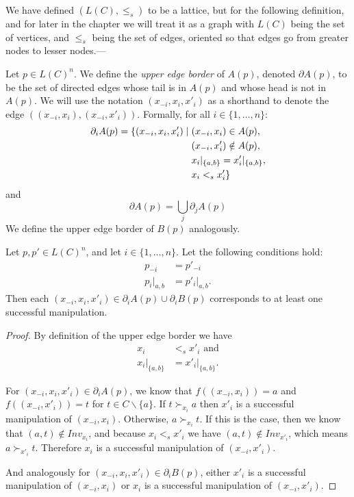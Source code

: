 	We have defined $(L(C), \le_s)$ to be a lattice, but for the following definition, and for later in the chapter we will treat it as a graph with $L(C)$ being the set of vertices, and $\le_s$ being the set of edges, oriented so that edges go from greater nodes to lesser nodes.---

	\begin{definition}
		Let $p \in L(C)^n$. We define the \emph{upper edge border} of $A(p)$, denoted $\partial A(p)$, to be the set of directed edges whose tail is in $A(p)$ and whose head is not in $A(p)$. We will use the notation $(x_{-i}, x_i, x'_i)$ as a shorthand to denote the edge $((x_{-i},x_i), (x_{-i},x'_i))$. Formally, for all $i \in \{1, \ldots, n\}$:
			\begin{align*}
				\partial_i A(p) = \{ (x_{-i}, x_i, x'_i) \mid \hspace{1mm} & (x_{-i}, x_i) \in A(p), \\
				& (x_{-i}, x'_i) \notin A(p), \\
				& x_i|_{\{a,b\}} = x'_i|_{\{a,b\}}, \\
				& x_i <_s x'_i \}
			\end{align*}
		and
			\[
				\partial A(p) = \bigcup_j \partial_j A(p)
			\]
		We define the upper edge border of $B(p)$ analogously.
	\end{definition}

	\begin{lemma}
		\label{manipulation-per-edge-in-a}
		Let $p, p' \in L(C)^n$, and let $i \in \{1, \ldots, n\}$. Let the following conditions hold:
		\begin{align*}
			p_{-i} &= p'_{-i} \\
			p_i|_{a,b} &= p'_i|_{a,b}.
		\end{align*}
		Then each $(x_{-i}, x_i, x'_i) \in \partial_i A(p) \cup \partial_i B(p)$ corresponds to at least one successful manipulation.
	\end{lemma}

	\begin{proof}
		By definition of the upper edge border we have
		\begin{align*}
			x_i &<_s x'_i \text{ and} \\
			x_i|_{\{a,b\}} &= x'_i|_{\{a,b\}}.
		\end{align*}

		For $(x_{-i}, x_i, x'_i) \in \partial_i A(p)$, we know that $f((x_{-i}, x_i)) = a$ and $f((x_{-i}, x'_i)) = t$ for $t \in C \backslash \{a\}$. If $t \succ_{x_i} a$ then $x'_i$ is a successful manipulation of $(x_{-i}, x_i)$. Otherwise, $a \succ_{x_i} t$. If this is the case, then we know that $(a, t) \notin Inv_{x_i}$, and because $x_i <_s x'_i$ we have $(a, t) \notin Inv_{x'_i}$, which means $a \succ_{x'_i} t$. Therefore $x_i$ is a successful manipulation of $(x_{-i}, x'_i)$.

		And analogously for $(x_{-i}, x_i, x'_i) \in \partial_i B(p)$, either $x'_i$ is a successful manipulation of $(x_{-i}, x_i)$ or $x_i$ is a successful manipulation of $(x_{-i}, x'_i)$.
	\end{proof}

